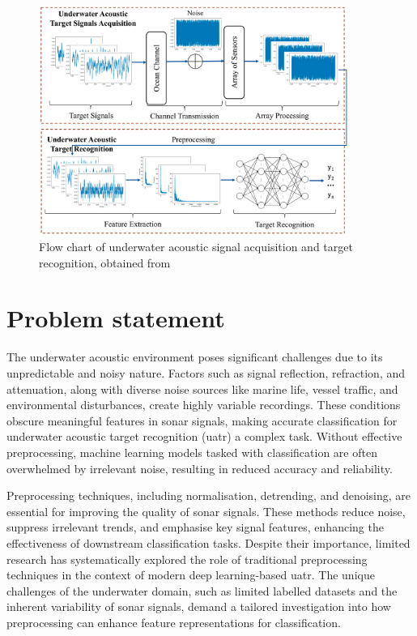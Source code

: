 \begin{figure}[htbp]
\centering 
\includegraphics[width=0.9\textwidth]{img/ch1/flowchart.png} 
\caption{Flow chart of underwater acoustic signal acquisition and target recognition, obtained from \cite[Fig.~1]{luo_survey_2023}} 
\label{fig:luo-flowchart} 
\end{figure}

\section{Problem statement}

The underwater acoustic environment poses significant challenges due to its unpredictable and noisy nature. Factors such as signal reflection, refraction, and attenuation, along with diverse noise sources like marine life, vessel traffic, and environmental disturbances, create highly variable recordings. These conditions obscure meaningful features in sonar signals, making accurate classification for underwater acoustic target recognition (\acrshort{uatr}) a complex task. Without effective preprocessing, machine learning models tasked with classification are often overwhelmed by irrelevant noise, resulting in reduced accuracy and reliability.

Preprocessing techniques, including normalisation, detrending, and denoising, are essential for improving the quality of sonar signals. These methods reduce noise, suppress irrelevant trends, and emphasise key signal features, enhancing the effectiveness of downstream classification tasks. Despite their importance, limited research has systematically explored the role of traditional preprocessing techniques in the context of modern deep learning-based \acrshort{uatr}. The unique challenges of the underwater domain, such as limited labelled datasets and the inherent variability of sonar signals, demand a tailored investigation into how preprocessing can enhance feature representations for classification.

